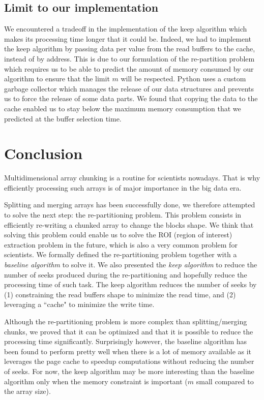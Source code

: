 \documentclass[sigconf, nonacm]{acmart}
\begin{document}
\subsection{Limit to our implementation}
We encountered a tradeoff in the implementation of the keep algorithm which
makes its processing time longer that it could be.
Indeed, we had to implement the keep algorithm by passing data per value from
the read buffers to the cache, instead of by address.
This is due to our formulation of the re-partition problem which requires us to
be able to predict the amount of memory consumed by our algorithm to ensure that
the limit $m$ will be respected.
Python uses a custom garbage collector which manages the release of our
data structures and prevents us to force the release of some data parts.
We found that copying the data to the cache enabled us to stay below the
maximum memory consumption that we predicted at the buffer selection time.


\section{Conclusion}

Multidimensional array chunking is a routine for scientists nowadays.
That is why efficiently processing such arrays is of major importance in the big data era.

Splitting and merging arrays has been successfully done, we therefore attempted
to solve the next step: the re-partitioning problem.
This problem consists in efficiently re-writing a chunked array to change the blocks shape.
We think that solving this problem could enable us to solve the ROI (region of interest)
extraction problem in the future, which is also a very common problem for scientists.
We formally defined the re-partitioning problem together with a \emph{baseline algorithm} to solve it.
We also presented the \emph{keep algorithm} to reduce the number of seeks produced during
the re-partitioning and hopefully reduce the processing time of such task.
The keep algorithm reduces the number of seeks by
(1) constraining the read buffers shape to minimize the read time, and
(2) leveraging a ``cache" to minimize the write time.

Although the re-partitioning problem is more complex than splitting/merging chunks,
we proved that it can be optimized and that it is possible to reduce the
processing time significantly.
Surprisingly however, the baseline algorithm has been found to perform pretty
well when there is a lot of memory available as it leverages the page cache to
speedup computations without reducing the number of seeks.
For now, the keep algorithm may be more interesting than the baseline algorithm
only when the memory constraint is important ($m$ small compared to the array size).
\end{document}

